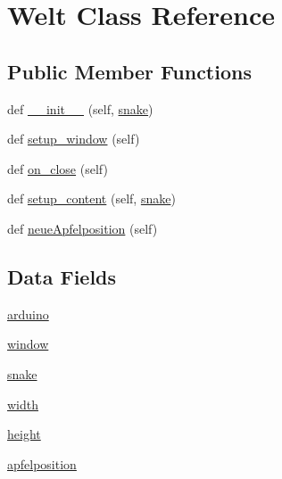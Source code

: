 \hypertarget{class_projekt_01_snake_01auf_01_python_1_1_welt}{}\section{Welt Class Reference}
\label{class_projekt_01_snake_01auf_01_python_1_1_welt}
\subsection*{Public Member Functions}
\begin{DoxyCompactItemize}
\item 
def \mbox{\hyperlink{class_projekt_01_snake_01auf_01_python_1_1_welt_a2d656a42de20fa4f426f6eb48bdeaab4}{\+\_\+\+\_\+init\+\_\+\+\_\+}} (self, \mbox{\hyperlink{class_projekt_01_snake_01auf_01_python_1_1_welt_aa798779259654cac04213978cf4297ab}{snake}})
\item 
def \mbox{\hyperlink{class_projekt_01_snake_01auf_01_python_1_1_welt_a9fe79fb8dbee1e660dc971b137c55f3f}{setup\+\_\+window}} (self)
\item 
def \mbox{\hyperlink{class_projekt_01_snake_01auf_01_python_1_1_welt_a7e20a417210b832ce9e307ce5dc0f2a8}{on\+\_\+close}} (self)
\item 
def \mbox{\hyperlink{class_projekt_01_snake_01auf_01_python_1_1_welt_a4d48c7cf7004e4bfdd045072a36a1272}{setup\+\_\+content}} (self, \mbox{\hyperlink{class_projekt_01_snake_01auf_01_python_1_1_welt_aa798779259654cac04213978cf4297ab}{snake}})
\item 
def \mbox{\hyperlink{class_projekt_01_snake_01auf_01_python_1_1_welt_aa2d78aa80b3d5bcb0f186d9f7778a439}{neue\+Apfelposition}} (self)
\end{DoxyCompactItemize}
\subsection*{Data Fields}
\begin{DoxyCompactItemize}
\item 
\mbox{\hyperlink{class_projekt_01_snake_01auf_01_python_1_1_welt_a3f424772edaa120b12bda2b9addc2bf5}{arduino}}
\item 
\mbox{\hyperlink{class_projekt_01_snake_01auf_01_python_1_1_welt_a04a8a2bbfa9c15500892b8e5033d625b}{window}}
\item 
\mbox{\hyperlink{class_projekt_01_snake_01auf_01_python_1_1_welt_aa798779259654cac04213978cf4297ab}{snake}}
\item 
\mbox{\hyperlink{class_projekt_01_snake_01auf_01_python_1_1_welt_a5558ace5433f9aabbf0a0ec059900d94}{width}}
\item 
\mbox{\hyperlink{class_projekt_01_snake_01auf_01_python_1_1_welt_a509290c21d570ff479c1b9d9b1fe8810}{height}}
\item 
\mbox{\hyperlink{class_projekt_01_snake_01auf_01_python_1_1_welt_afad369a9e31a92fa34db651bd1b93951}{apfelposition}}
\end{DoxyCompactItemize}
